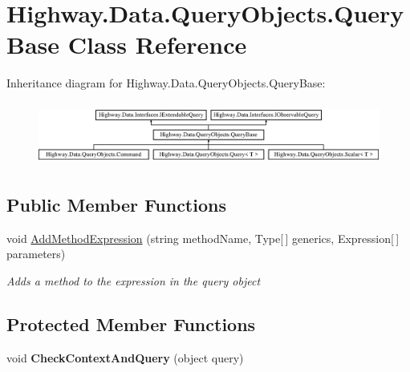 \hypertarget{class_highway_1_1_data_1_1_query_objects_1_1_query_base}{\section{Highway.\-Data.\-Query\-Objects.\-Query\-Base Class Reference}
\label{class_highway_1_1_data_1_1_query_objects_1_1_query_base}
}
Inheritance diagram for Highway.\-Data.\-Query\-Objects.\-Query\-Base\-:\begin{figure}[H]
\begin{center}
\leavevmode
\includegraphics[height=2.089552cm]{class_highway_1_1_data_1_1_query_objects_1_1_query_base}
\end{center}
\end{figure}
\subsection*{Public Member Functions}
\begin{DoxyCompactItemize}
\item 
void \hyperlink{class_highway_1_1_data_1_1_query_objects_1_1_query_base_ace7c9da4af343caab20f5fdd38b47557}{Add\-Method\-Expression} (string method\-Name, Type\mbox{[}$\,$\mbox{]} generics, Expression\mbox{[}$\,$\mbox{]} parameters)
\begin{DoxyCompactList}\small\item\em Adds a method to the expression in the query object \end{DoxyCompactList}\end{DoxyCompactItemize}
\subsection*{Protected Member Functions}
\begin{DoxyCompactItemize}
\item 
\hypertarget{class_highway_1_1_data_1_1_query_objects_1_1_query_base_a2abee86dc5bd2bfa2463c343e7574dfb}{void {\bfseries Check\-Context\-And\-Query} (object query)}\label{class_highway_1_1_data_1_1_query_objects_1_1_query_base_a2abee86dc5bd2bfa2463c343e7574dfb}

\end{DoxyCompactItemize}
